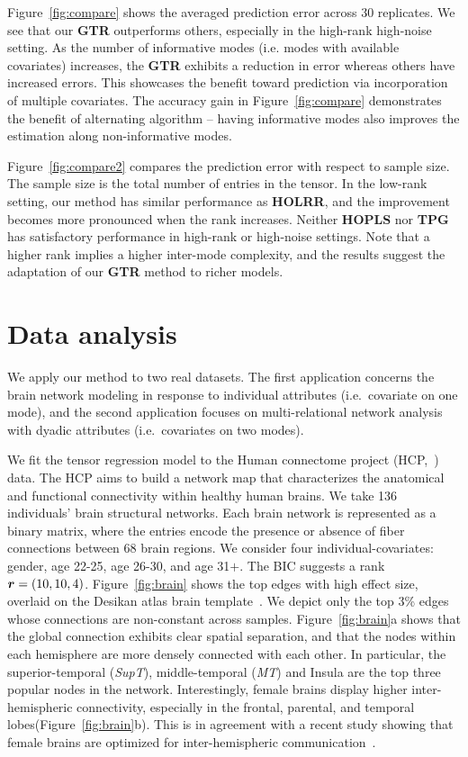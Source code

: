 \documentclass{article}
\theoremstyle{plain}
\theoremstyle{definition}
\begin{document}
Figure~\ref{fig:compare} shows the averaged prediction error across 30 replicates. We see that our {\bf GTR} outperforms others, especially in the high-rank high-noise setting. As the number of informative modes (i.e. modes with available covariates) increases, the {\bf GTR} exhibits a reduction in error whereas others have increased errors. This showcases the benefit toward prediction via incorporation of multiple covariates.  The accuracy gain in Figure~\ref{fig:compare} demonstrates the benefit of alternating algorithm -- having informative modes also improves the estimation along non-informative modes. 


Figure~\ref{fig:compare2} compares the prediction error with respect to sample size. The sample size is the total number of entries in the tensor. In the low-rank setting, our method has similar performance as {\bf HOLRR}, and the improvement becomes more pronounced when the rank increases. Neither {\bf HOPLS} nor {\bf TPG} has satisfactory performance in high-rank or high-noise settings. Note that a higher rank implies a higher inter-mode complexity, and the results suggest the adaptation of our {\bf GTR} method to richer models. 


\section{Data analysis}
We apply our method to two real datasets. The first application concerns the brain network modeling in response to individual attributes (i.e.\ covariate on one mode), and the second application focuses on multi-relational network analysis with dyadic attributes (i.e.\ covariates on two modes). 

We fit the tensor regression model to the Human connectome project (HCP,~\citep{HCP}) data. The  HCP aims to build a network map  that characterizes the anatomical and functional connectivity within healthy human brains. We take 136 individuals' brain structural networks. Each brain network is represented as a binary matrix, where the entries encode the presence or absence of fiber connections between 68 brain regions. We consider four individual-covariates: gender, age 22-25, age 26-30, and age 31$+$. The BIC suggests a rank $\bm{r}=(10,10,4)$. Figure~\ref{fig:brain} shows the top edges with high effect size, overlaid on the Desikan atlas brain template~\cite{xia2013brainnet}.  We depict only the top 3\% edges whose connections are non-constant across samples.  Figure~\ref{fig:brain}a shows that the global connection exhibits clear spatial separation, and that the nodes within each hemisphere are more densely connected with each other. In particular, the superior-temporal (\emph{SupT}), middle-temporal (\emph{MT}) and Insula are the top three popular nodes in the network. Interestingly, female brains display higher inter-hemispheric connectivity, especially in the frontal, parental, and temporal lobes(Figure~\ref{fig:brain}b). This is in agreement with a recent study showing that female brains are optimized for inter-hemispheric communication~\cite{ingalhalikar2014sex}. \\
\end{document}
